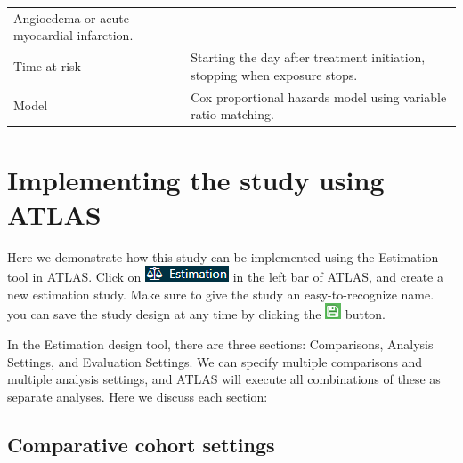 \documentclass[11pt]{book}
\begin{document}
\begin{longtable}[]{@{}ll@{}}
\begin{minipage}[t]{0.71\columnwidth}
Angioedema or acute myocardial infarction.\strut
\end{minipage}\tabularnewline
\begin{minipage}[t]{0.23\columnwidth}\raggedright\strut
Time-at-risk\strut
\end{minipage} & \begin{minipage}[t]{0.71\columnwidth}\raggedright\strut
Starting the day after treatment initiation, stopping when exposure
stops.\strut
\end{minipage}\tabularnewline
\begin{minipage}[t]{0.23\columnwidth}\raggedright\strut
Model\strut
\end{minipage} & \begin{minipage}[t]{0.71\columnwidth}\raggedright\strut
Cox proportional hazards model using variable ratio matching.\strut
\end{minipage}\tabularnewline
\bottomrule
\end{longtable}

\section{Implementing the study using
ATLAS}\label{implementing-the-study-using-atlas}

Here we demonstrate how this study can be implemented using the
Estimation tool in ATLAS. Click on
\includegraphics{images/PopulationLevelEstimation/estimation.png} in the
left bar of ATLAS, and create a new estimation study. Make sure to give
the study an easy-to-recognize name. you can save the study design at
any time by clicking the
\includegraphics{images/PopulationLevelEstimation/save.png} button.

In the Estimation design tool, there are three sections: Comparisons,
Analysis Settings, and Evaluation Settings. We can specify multiple
comparisons and multiple analysis settings, and ATLAS will execute all
combinations of these as separate analyses. Here we discuss each
section:

\subsection{Comparative cohort settings}\label{ComparisonSettings}
\end{document}
